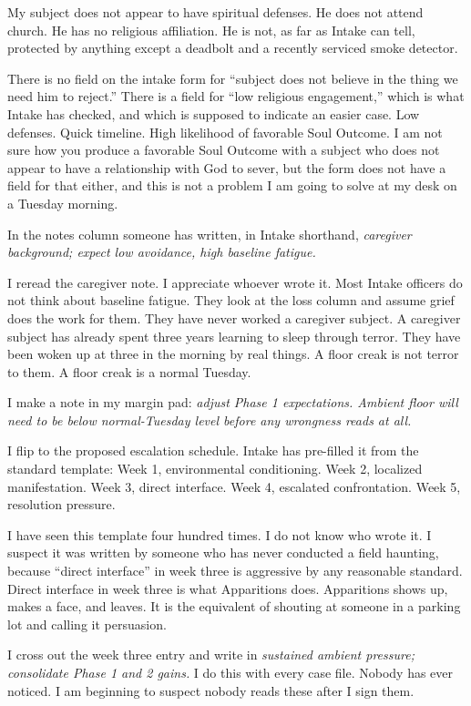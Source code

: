 My subject does not appear to have spiritual defenses. He does not attend church. He has no religious affiliation. He is not, as far as Intake can tell, protected by anything except a deadbolt and a recently serviced smoke detector.

There is no field on the intake form for ``subject does not believe in the thing we need him to reject.'' There is a field for ``low religious engagement,'' which is what Intake has checked, and which is supposed to indicate an easier case. Low defenses. Quick timeline. High likelihood of favorable Soul Outcome. I am not sure how you produce a favorable Soul Outcome with a subject who does not appear to have a relationship with God to sever, but the form does not have a field for that either, and this is not a problem I am going to solve at my desk on a Tuesday morning.

In the notes column someone has written, in Intake shorthand, \emph{caregiver background; expect low avoidance, high baseline fatigue.}

I reread the caregiver note. I appreciate whoever wrote it. Most Intake officers do not think about baseline fatigue. They look at the loss column and assume grief does the work for them. They have never worked a caregiver subject. A caregiver subject has already spent three years learning to sleep through terror. They have been woken up at three in the morning by real things. A floor creak is not terror to them. A floor creak is a normal Tuesday.

I make a note in my margin pad: \emph{adjust Phase 1 expectations. Ambient floor will need to be below normal-Tuesday level before any wrongness reads at all.}

I flip to the proposed escalation schedule. Intake has pre-filled it from the standard template: Week 1, environmental conditioning. Week 2, localized manifestation. Week 3, direct interface. Week 4, escalated confrontation. Week 5, resolution pressure.

I have seen this template four hundred times. I do not know who wrote it. I suspect it was written by someone who has never conducted a field haunting, because ``direct interface'' in week three is aggressive by any reasonable standard. Direct interface in week three is what Apparitions does. Apparitions shows up, makes a face, and leaves. It is the equivalent of shouting at someone in a parking lot and calling it persuasion.

I cross out the week three entry and write in \emph{sustained ambient pressure; consolidate Phase 1 and 2 gains.} I do this with every case file. Nobody has ever noticed. I am beginning to suspect nobody reads these after I sign them.

